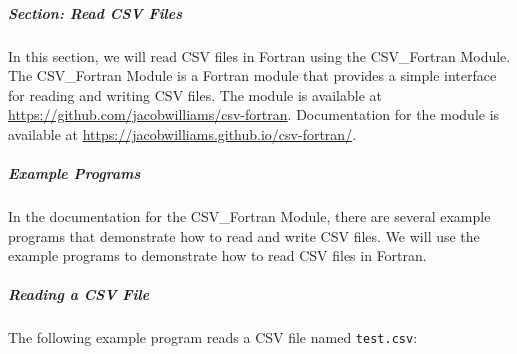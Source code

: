 \subparagraph{Section: Read CSV Files}

In this section, we will read CSV files in Fortran using the CSV\_Fortran Module.  The CSV\_Fortran Module is a Fortran module that provides a simple interface for reading and writing CSV files.  The module is available at \href{https://github.com/jacobwilliams/csv-fortran}{https://github.com/jacobwilliams/csv-fortran}.  Documentation for the module is available at \href{https://jacobwilliams.github.io/csv-fortran/}{https://jacobwilliams.github.io/csv-fortran/}.

\subparagraph{Example Programs}

In the documentation for the CSV\_Fortran Module, there are several example programs that demonstrate how to read and write CSV files.  We will use the example programs to demonstrate how to read CSV files in Fortran.

\subparagraph{Reading a CSV File}

The following example program reads a CSV file named \texttt{test.csv}:

